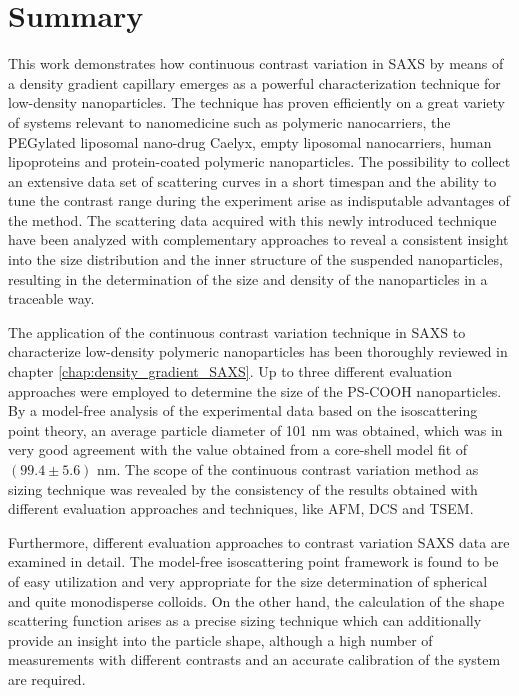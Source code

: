 \chapter{Summary} 
\label{chap:conclusions}
This work demonstrates how continuous contrast variation in SAXS by means of a density gradient capillary emerges as a powerful characterization technique for low-density nanoparticles. The technique has proven efficiently on a great variety of systems relevant to nanomedicine such as polymeric nanocarriers, the PEGylated liposomal nano-drug Caelyx\textregistered, empty liposomal nanocarriers, human lipoproteins and protein-coated polymeric nanoparticles. The possibility to collect an extensive data set of scattering curves in a short timespan and the ability to tune the contrast range during the experiment arise as indisputable advantages of the method. The scattering data acquired with this newly introduced technique have been analyzed with complementary approaches to reveal a consistent insight into the size distribution and the inner structure of the suspended nanoparticles, resulting in the determination of the size and density of the nanoparticles in a traceable way. 

The application of the continuous contrast variation technique in SAXS to characterize low-density polymeric nanoparticles has been thoroughly reviewed in chapter \ref{chap:density_gradient_SAXS}. Up to three different evaluation approaches were employed to determine the size of the PS-COOH nanoparticles. By a model-free analysis of the experimental data based on the isoscattering point theory, an average particle diameter of 101 nm was obtained, which was in very good agreement with the value obtained from a core-shell model fit of $\left( 99.4 \pm 5.6  \right)$ nm. The scope of the continuous contrast variation method as sizing technique was revealed by the consistency of the results obtained with different evaluation approaches and techniques, like AFM, DCS and TSEM.

Furthermore, different evaluation approaches to contrast variation SAXS data are examined in detail. The model-free isoscattering point framework is found to be of easy utilization and very appropriate for the size determination of spherical and quite monodisperse colloids. On the other hand, the calculation of the shape scattering function arises as a precise sizing technique which can additionally provide an insight into the particle shape, although a high number of measurements with different contrasts and an accurate calibration of the system are required.

